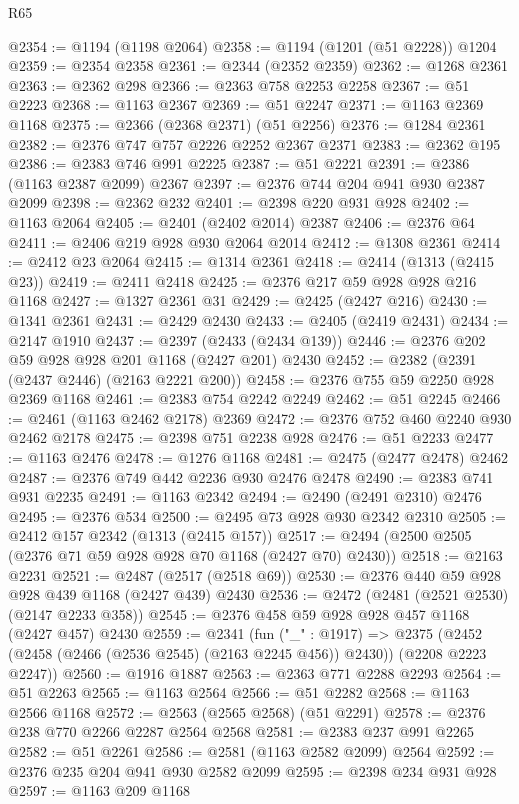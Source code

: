 \begin{lexlean}{R65}
\begin{coremodule}
@2354 := @1194 (@1198 @2064)
@2358 := @1194 (@1201 (@51 @2228)) @1204
@2359 := @2354 @2358
@2361 := @2344 (@2352 @2359)
@2362 := @1268 @2361
@2363 := @2362 @298
@2366 := @2363 @758 @2253 @2258
@2367 := @51 @2223
@2368 := @1163 @2367
@2369 := @51 @2247
@2371 := @1163 @2369 @1168
@2375 := @2366 (@2368 @2371) (@51 @2256)
@2376 := @1284 @2361
@2382 := @2376 @747 @757 @2226 @2252 @2367 @2371
@2383 := @2362 @195
@2386 := @2383 @746 @991 @2225
@2387 := @51 @2221
@2391 := @2386 (@1163 @2387 @2099) @2367
@2397 := @2376 @744 @204 @941 @930 @2387 @2099
@2398 := @2362 @232
@2401 := @2398 @220 @931 @928
@2402 := @1163 @2064
@2405 := @2401 (@2402 @2014) @2387
@2406 := @2376 @64
@2411 := @2406 @219 @928 @930 @2064 @2014
@2412 := @1308 @2361
@2414 := @2412 @23 @2064
@2415 := @1314 @2361
@2418 := @2414 (@1313 (@2415 @23))
@2419 := @2411 @2418
@2425 := @2376 @217 @59 @928 @928 @216 @1168
@2427 := @1327 @2361 @31
@2429 := @2425 (@2427 @216)
@2430 := @1341 @2361
@2431 := @2429 @2430
@2433 := @2405 (@2419 @2431)
@2434 := @2147 @1910
@2437 := @2397 (@2433 (@2434 @139))
@2446 := @2376 @202 @59 @928 @928 @201 @1168 (@2427 @201) @2430
@2452 := @2382 (@2391 (@2437 @2446) (@2163 @2221 @200))
@2458 := @2376 @755 @59 @2250 @928 @2369 @1168
@2461 := @2383 @754 @2242 @2249
@2462 := @51 @2245
@2466 := @2461 (@1163 @2462 @2178) @2369
@2472 := @2376 @752 @460 @2240 @930 @2462 @2178
@2475 := @2398 @751 @2238 @928
@2476 := @51 @2233
@2477 := @1163 @2476
@2478 := @1276 @1168
@2481 := @2475 (@2477 @2478) @2462
@2487 := @2376 @749 @442 @2236 @930 @2476 @2478
@2490 := @2383 @741 @931 @2235
@2491 := @1163 @2342
@2494 := @2490 (@2491 @2310) @2476
@2495 := @2376 @534
@2500 := @2495 @73 @928 @930 @2342 @2310
@2505 := @2412 @157 @2342 (@1313 (@2415 @157))
@2517 := @2494 (@2500 @2505 (@2376 @71 @59 @928 @928 @70 @1168 (@2427 @70) @2430))
@2518 := @2163 @2231
@2521 := @2487 (@2517 (@2518 @69))
@2530 := @2376 @440 @59 @928 @928 @439 @1168 (@2427 @439) @2430
@2536 := @2472 (@2481 (@2521 @2530) (@2147 @2233 @358))
@2545 := @2376 @458 @59 @928 @928 @457 @1168 (@2427 @457) @2430
@2559 := @2341
    (fun ("_" : @1917) =>
    @2375 (@2452 (@2458 (@2466 (@2536 @2545) (@2163 @2245 @456)) @2430)) (@2208 @2223 @2247))
@2560 := @1916 @1887
@2563 := @2363 @771 @2288 @2293
@2564 := @51 @2263
@2565 := @1163 @2564
@2566 := @51 @2282
@2568 := @1163 @2566 @1168
@2572 := @2563 (@2565 @2568) (@51 @2291)
@2578 := @2376 @238 @770 @2266 @2287 @2564 @2568
@2581 := @2383 @237 @991 @2265
@2582 := @51 @2261
@2586 := @2581 (@1163 @2582 @2099) @2564
@2592 := @2376 @235 @204 @941 @930 @2582 @2099
@2595 := @2398 @234 @931 @928
@2597 := @1163 @209 @1168

\end{coremodule}
\end{lexlean}
